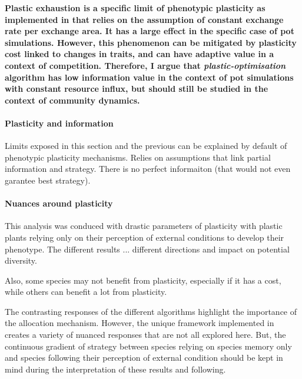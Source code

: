 \textbf{Plastic exhaustion is a specific limit of phenotypic plasticity as implemented in \model that relies on the assumption of constant exchange rate per exchange area. It has a large effect in the specific case of pot simulations. However, this phenomenon can be mitigated by plasticity cost linked to changes in traits, and can have adaptive value in a context of competition. Therefore, I argue that \textit{plastic-optimisation} algorithm  has low information value in the context of pot simulations with constant resource influx, but should still be studied in the context of community dynamics.}

\paragraph{Plasticity and information}

Limits exposed in this section and the previous can be explained by default of phenotypic plasticity mechanisms. Relies on assumptions that link partial information and strategy. There is no perfect informaiton (that would not even garantee best strategy). 

\paragraph{Nuances around plasticity}
This analysis was conduced with drastic parameters of plasticity with plastic plants relying only on their perception of external conditions to develop their phenotype. The different results ... different directions and impact on potential diversity.

Also, some species may not benefit from plasticity, especially if it has a cost, while others can benefit a lot from plasticity.

The contrasting responses of the different algorithms highlight the importance of the allocation mechanism. However, the unique framework implemented in \model creates a variety of nuanced responses that are not all explored here. But, the continuous gradient of strategy between species relying on species memory only and species following their perception of external condition should be kept in mind during the interpretation of these results and following.
%
%

